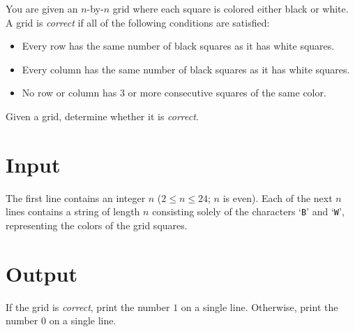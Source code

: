 
\ifdefined\pacnw
{}
\else
{}
\fi

\noindent
You are given an $n$-by-$n$ grid where each square is colored either
black or white.
A grid is \emph{correct} if all of the following conditions are satisfied:

\begin{itemize}
\item Every row has the same number of
black squares as it has white squares.
\item Every column has the same number of
black squares as it has white squares.
\item No row or column has $3$ or more consecutive
squares of the same color.
\end{itemize}

Given a grid, determine whether it is \emph{correct}.

\section*{Input}

The first line contains an integer $n$ ($2\le n\le 24$; $n$ is even).
Each of the next $n$ lines contains a string of length $n$ consisting
solely of the characters `{\tt B}' and `{\tt W}', representing the colors of the grid squares.

\section*{Output}

If the grid is \emph{correct}, print the number $1$ on a single line.
Otherwise, print the number $0$ on a single line.
